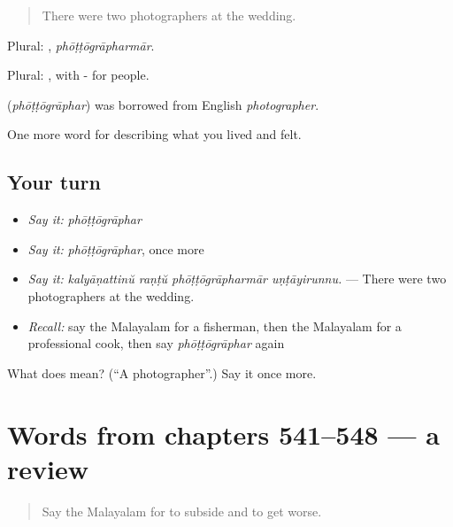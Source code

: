 \begin{quote}
There were two photographers at the wedding.
\end{quote}

Plural: , \emph{phōṭṭōgrāpharmār}.

Plural: , with - for people.

\begin{cousinweb}
\textbf{} (\emph{phōṭṭōgrāphar}) was borrowed from English \emph{photographer}.
\end{cousinweb}

\begin{grammarlens}[title={What you've built}]
One more word for describing what you lived and felt.
\end{grammarlens}

\subsection*{Your turn}
\begin{itemize}
\raggedright
  \item \emph{Say it:} \emph{phōṭṭōgrāphar}
  \item \emph{Say it:} \emph{phōṭṭōgrāphar}, once more
  \item \emph{Say it:} \emph{kalyāṇattinŭ raṇṭŭ phōṭṭōgrāpharmār uṇṭāyirunnu.} — There were two photographers at the wedding.
  \item \emph{Recall:} say the Malayalam for a fisherman, then the Malayalam for a professional cook, then say \emph{phōṭṭōgrāphar} again
\end{itemize}

\begin{tcolorbox}[breakable,colback=teal!4,colframe=teal!35!black,title={Before you move on}]
What does  mean? (\textquotedblleft{}A photographer\textquotedblright{}.) Say it once more.
\end{tcolorbox}
\section[(dialogue)]{Words from chapters 541–548 — a review}

\label{lesson:ML-R548-review-541-548}



\begin{quote}
Say the Malayalam for to subside and to get worse.
\end{quote}

